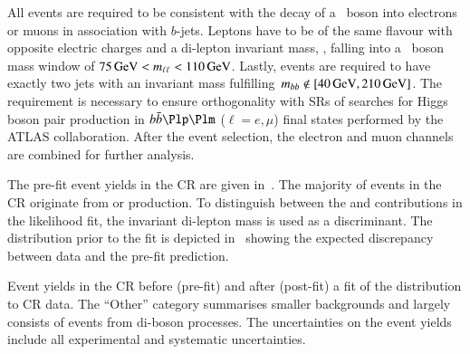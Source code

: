 All events are required to be consistent with the decay of a \PZ~boson into
electrons or muons in association with $b$-jets. Leptons have to be of the same
flavour with opposite electric charges and a di-lepton invariant mass, \mll, falling
into a \PZ~boson mass window of $\SI{75}{\ensuremath{\text{GeV}}} < m_{\ell\ell} < \SI{110}{\ensuremath{\text{GeV}}}$. Lastly,
events are required to have exactly two \btagged jets with an invariant mass
fulfilling~\mbox{$\mBB \not\in [\SI{40}{\GeV}, \SI{210}{\GeV}]$}. The \mBB
requirement is necessary to ensure orthogonality with SRs of searches for Higgs
boson pair production in $\bbbar\Plp\Plm$ ($\ell = e, \mu$) final states
performed by the ATLAS collaboration.
After the event selection, the electron and muon channels are combined for
further analysis.

The pre-fit event yields in the \ZHF CR are given in~. The
majority of events in the CR originate from \ZHF
or \ttbar production.
To distinguish between the \ZHF and \ttbar contributions in the likelihood fit,
the invariant di-lepton mass is used as a discriminant. The \mll distribution
prior to the fit is depicted in~ showing the expected
discrepancy between data and the pre-fit prediction.

\begin{table}[htbp]
  \centering

  \caption[Event yields in the \ZHF~CR before and after the fit to CR
  data.]{Event yields in the \ZHF CR before (pre-fit) and after (post-fit) a fit
    of the \mll distribution to CR data. The ``Other'' category summarises
    smaller backgrounds and largely consists of events from di-boson
    processes. The uncertainties on the event yields include all experimental
    and systematic uncertainties.}%
  \label{tab:zcr_yields}

  
\end{table}

